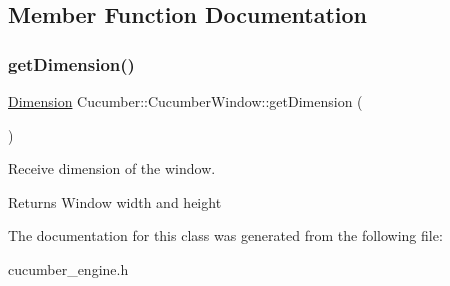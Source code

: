 \subsection{Member Function Documentation}
\hypertarget{classCucumber_1_1CucumberWindow_a06ae08d3cfe34d59b5b50f9271fb2404}{}\label{classCucumber_1_1CucumberWindow_a06ae08d3cfe34d59b5b50f9271fb2404} 
\subsubsection{\texorpdfstring{get\+Dimension()}{getDimension()}}
{\footnotesize\ttfamily \hyperlink{classCucumber_1_1Dimension}{Dimension} Cucumber\+::\+Cucumber\+Window\+::get\+Dimension (\begin{DoxyParamCaption}{ }\end{DoxyParamCaption})}



Receive dimension of the window. 

\begin{DoxyReturn}{Returns}
Window width and height 
\end{DoxyReturn}


The documentation for this class was generated from the following file\+:\begin{DoxyCompactItemize}
\item 
cucumber\+\_\+engine.\+h\end{DoxyCompactItemize}
